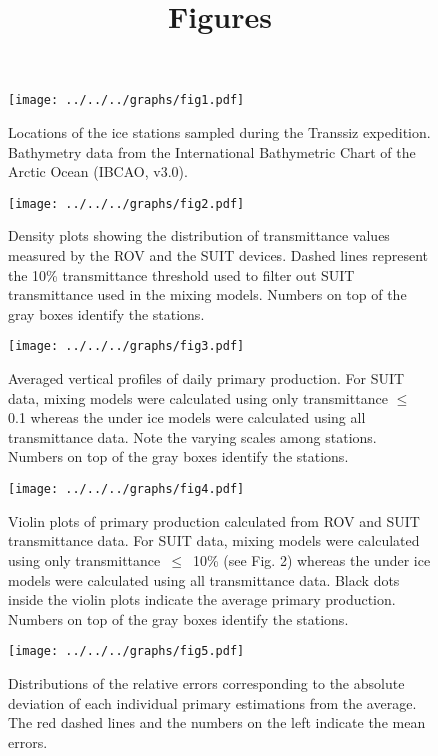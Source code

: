 \documentclass[12pt,a4paper]{scrartcl}
\title{Figures}
\date{}
\begin{document}
\maketitle

\begin{figure}[h]
	\centering
	\texttt{[image: ../../../graphs/fig1.pdf]}
	\caption{Locations of the ice stations sampled during the Transsiz expedition. Bathymetry data from the International Bathymetric Chart of the Arctic Ocean (IBCAO, v3.0).}
\end{figure}

\clearpage
\newpage

\begin{figure}[h]
	\centering
	\texttt{[image: ../../../graphs/fig2.pdf]}
	\caption{Density plots showing the distribution of transmittance values measured by the ROV and the SUIT devices. Dashed lines represent the 10\% transmittance threshold used to filter out SUIT transmittance used in the mixing models. Numbers on top of the gray boxes identify the stations.}
\end{figure}

\clearpage
\newpage

\begin{figure}[h]
	\centering
	\texttt{[image: ../../../graphs/fig3.pdf]}
	\caption{Averaged vertical profiles of daily primary production. For SUIT data, mixing models were calculated using only transmittance $\le$ 0.1 whereas the under ice models were calculated using all transmittance data. Note the varying scales among stations. Numbers on top of the gray boxes identify the stations.}
\end{figure}

\clearpage
\newpage

\begin{figure}[h]
	\centering
	\texttt{[image: ../../../graphs/fig4.pdf]}
	\caption{Violin plots of primary production calculated from ROV and SUIT transmittance data. For SUIT data, mixing models were calculated using only transmittance~$\le$~10\% (see Fig. 2) whereas the under ice models were calculated using all transmittance data. Black dots inside the violin plots indicate the average primary production. Numbers on top of the gray boxes identify the stations.}
\end{figure}

\clearpage
\newpage

\begin{figure}[h]
	\centering
	\texttt{[image: ../../../graphs/fig5.pdf]}
	\caption{Distributions of the relative errors corresponding to the absolute deviation of each individual primary estimations from the average. The red dashed lines and the numbers on the left indicate the mean errors.}
\end{figure}
\end{document}
